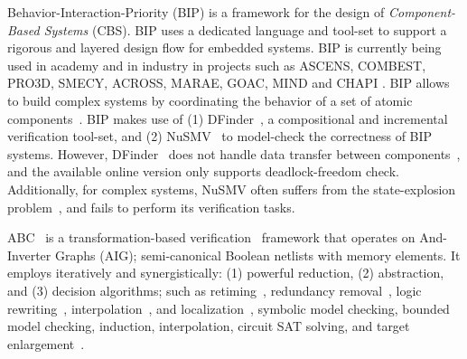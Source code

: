 %
Behavior-Interaction-Priority (BIP) is a framework for the design of 
{\em Component-Based Systems} (CBS). 
BIP uses a dedicated language and tool-set to support a rigorous 
and layered design flow for embedded systems. 
BIP is currently being used in academy and in industry in projects such as 
ASCENS, COMBEST, PRO3D, SMECY, ACROSS, MARAE, GOAC, MIND and CHAPI \cite{bipwebsite}. 
BIP allows to build complex systems by coordinating the behavior of a set of 
atomic components~\cite{bip11}.
BIP makes use of (1) DFinder~\cite{dfinder}, a compositional  
and incremental verification tool-set, and (2) NuSMV~\cite{nusmv}
to model-check the correctness of BIP systems. 
However, DFinder~\cite{BBL14} does not handle data transfer between components~\cite{QiangB15}, 
and the available online version only supports deadlock-freedom check.
Additionally, for complex systems, NuSMV often suffers from the state-explosion problem~\cite{sipser2006introduction}, and fails to perform its verification tasks.

ABC~\cite{brayton2010abc} is a transformation-based 
verification~\cite{KuBa01} framework that operates on 
And-Inverter Graphs (AIG); semi-canonical Boolean netlists with
memory elements. It employs iteratively and synergistically: (1) powerful reduction, (2) abstraction, and (3) decision algorithms; such as
retiming~\cite{KuBa01}, 
redundancy removal~\cite{HmBPK05,KuMP01,BjesseC00,aziz-fmsd-00}, 
logic rewriting~\cite{BjBo04}, interpolation~\cite{McMillan03}, 
and localization~\cite{Wang03}, 
symbolic model checking, bounded model checking, induction, 
interpolation, circuit SAT solving, 
and target enlargement~\cite{MoGS00,MoMZ01,HoSH00,BaKuAb02,Hari05expert}.

